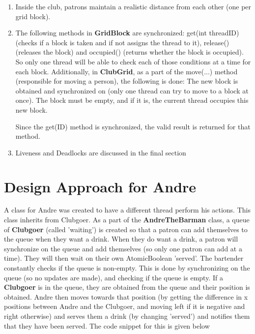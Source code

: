 \documentclass{assignment}
\begin{document}
\begin{enumerate}
{    The exit was accessed by only one patron since it is a \textbf{GridBlock} that patrons walk to. This is talked about in the rule that a \textbf{GridBlock} can only be accessed by one patron}

    \item{Inside the club, patrons maintain a realistic distance from each other (one per grid block).}
    \item[]{The following methods in \textbf{GridBlock} are synchronized: get(int threadID) (checks if a block is taken and if not assigns the thread to it), release() (releases the block) and occupied() (returns whether the block is occupied). So only one thread will be able to check each of those conditions at a time for each block. Additionally, in \textbf{ClubGrid}, as a part of the move(...) method (responsible for moving a person), the following is done: The new block is obtained and synchronized on (only one thread can try to move to a block at once). The block must be empty, and if it is, the current thread occupies this new block.
    \begin{center}
     
    \end{center}
Since the get(ID) method is synchronized, the valid result is returned for that method. 
        }
        \item{Liveness and Deadlocks are discussed in the final section}    
\end{enumerate}

\section{Design Approach for Andre}
A class for Andre was created to have a different thread perform his actions. This class inherits from Clubgoer. As a part of the \textbf{AndreTheBarman} class, a queue of \textbf{Clubgoer} (called 'waiting') is created so that a patron can add themselves to the queue when they want a drink. When they do want a drink, a patron will synchronize on the queue and add themselves (so only one patron can add at a time). They will then wait on their own AtomicBoolean 'served'. The bartender constantly checks if the queue is non-empty. This is done by synchronizing on the queue (so no updates are made), and checking if the queue is empty. If a \textbf{Clubgoer} is in the queue, they are obtained from the queue and their position is obtained. Andre then moves towards that position (by getting the difference in x positions between Andre and the Clubgoer, and moving left if it is negative and right otherwise) and serves them a drink (by changing 'served') and notifies them that they have been served. The code snippet for this is given below
\begin{center}
     
\end{center}
\end{document}
